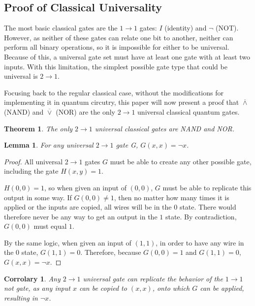 \documentclass[12pt]{article}
\newcommand{\nand}{\overline{\land}}
\newcommand{\nor}{\overline{\lor}}
\begin{document}
\subsection{Proof of Classical Universality}
The most basic classical gates are the $1 \to 1$ gates: $I$ (identity) and $\neg$ (NOT). However, as neither of these gates can relate one bit to another, neither can perform all binary operations, so it is impossible for either to be universal. Because of this, a universal gate set must have at least one gate with at least two inputs.
With this limitation, the simplest possible gate type that could be universal is $2 \to 1$.

Focusing back to the regular classical case, without the modifications for implementing it in quantum circutry, this paper will now present a proof that $\nand$ (NAND) and $\nor$ (NOR) are the only $2 \to 1$ universal classical quantum gates.


\newtheorem{theorem}{Theorem}
\newtheorem{lemma}{Lemma}
\newtheorem{corrolary}{Corrolary}

\begin{theorem}
    The only $2 \to 1$ universal classical gates are NAND and NOR.
\end{theorem}

\begin{lemma}
    For any universal $2 \to 1$ gate G, $G(x, x) = \neg x$.
\end{lemma}

\begin{proof}
    All universal $2 \to 1$ gates $G$ must be able to create any other possible gate, including the gate $H(x, y) = 1$.

    $H(0, 0) = 1$, so when given an input of $(0, 0)$, $G$ must be able to replicate this output in some way. If $G(0, 0) \ne 1$, then no matter how many times it is applied or the inputs are copied, all wires will be in the $0$ state. There would therefore never be any way to get an output in the $1$ state. By contradiction, $G(0, 0)$ must equal $1$.
    
    By the same logic, when given an input of $(1, 1)$, in order to have any wire in the $0$ state, $G(1, 1) = 0$.
    Therefore, because $G(0, 0) = 1$ and $G(1, 1) = 0$, $G(x, x) = \neg x$. 
\end{proof}

\begin{corrolary}
    Any $2 \to 1$ universal gate can replicate the behavior of the $1 \to 1$ not gate, as any input $x$ can be copied to $(x, x)$, onto which $G$ can be applied, resulting in $\neg x$.
\end{corrolary}
\end{document}

